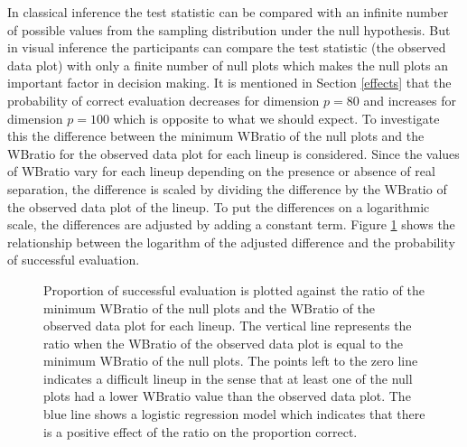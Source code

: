 \documentclass[12]{article}
\begin{document}
In classical inference the test statistic can be compared with an infinite number of possible values from the sampling distribution under the null hypothesis. But in visual inference the participants can compare the test statistic (the observed data plot) with only a finite number of null plots which makes the null plots an important factor in decision making. It is mentioned in Section \ref{effects} that the probability of correct evaluation decreases for dimension $p = 80$ and increases for dimension $p = 100$ which is opposite to what we should expect. To investigate this the difference between the minimum WBratio of the null plots and the WBratio for the observed data plot for each lineup is considered. Since the values of WBratio vary for each lineup depending on the presence or absence of real separation, the difference is scaled by dividing the difference by the WBratio of the observed data plot of the lineup. To put the differences on a logarithmic scale, the differences are adjusted by adding a constant term. Figure \ref{null} shows the relationship between the logarithm of the adjusted difference and the probability of successful evaluation.  

\begin{figure}[hbtp]
   \centering
       \caption{Proportion of successful evaluation is plotted against the ratio of the minimum WBratio of the null plots and the WBratio of the observed data plot for each lineup. The vertical line represents the ratio when the WBratio of the observed data plot is equal to the minimum WBratio of the null plots. The points left to the zero line indicates a difficult lineup in the sense that at least one of the null plots had a lower WBratio value than the observed data plot. The blue line shows a logistic regression model which indicates that there is a positive effect of the ratio on the proportion correct.}
       \label{null}
\end{figure}
\end{document}
